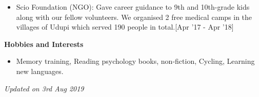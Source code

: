\documentclass[a4paper,10pt]{article}
\begin{document}
\begin{itemize}
  \setlength{\itemsep}{1pt}
  \item Scio Foundation (NGO):
  Gave career guidance to 9th and 10th-grade kids along with our fellow volunteers. We organised 2 free medical camps in the villages of Udupi which served 190 people in total.\hfill {\small{{[Apr '17 - Apr '18]}}\/} 
\end{itemize}

\colorbox{titleColor}{\parbox{6.7in}{\textbf{Hobbies and Interests}}}

\begin{itemize}
  \setlength{\itemsep}{1pt}
  \item Memory training, Reading psychology books, non-fiction, Cycling, Learning new languages.
\end{itemize}

\textit{Updated on 3rd Aug 2019}
\end{document}
